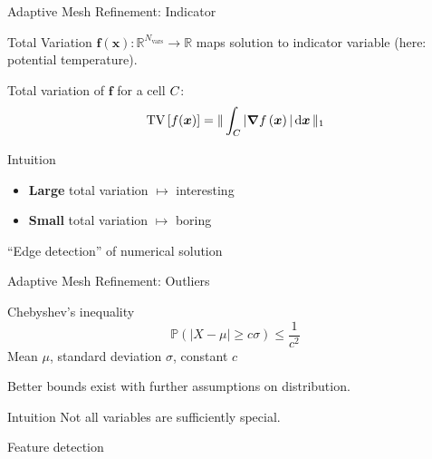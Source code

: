 \documentclass[aspectratio=169]{beamer}
\begin{document}
\begin{frame}{Adaptive Mesh Refinement: Indicator}
  \begin{block}{Total Variation}
  $\bm{f}(\bm{x}): \mathbb{R}^{N_\text{vars}} \to \mathbb{R}$ maps solution to indicator variable (here: potential temperature).

  Total variation of $\bm{f}$ for a cell $C_{}$:
\begin{equation}
  \label{eq:tv}
  \tv \left[ f(\bm{x}) \right] =
  \Vert
\intdcell{ \vert \gradient{f \left( \bm{x} \right)} \vert }
\Vert_1
\end{equation}
    
  \end{block}

\begin{block}{Intuition}
  \begin{itemize}
\item \textbf{Large} total variation $\mapsto$ interesting
\item \textbf{Small} total variation $\mapsto$ boring
  \end{itemize}
  \enquote{Edge detection} of numerical solution
\end{block}

\end{frame}  

\begin{frame}{Adaptive Mesh Refinement: Outliers}
  \begin{block}{Chebyshev's inequality}
\begin{equation}
  \label{eq:chebychev}
  \mathbb{P}(\vert X - \mu \vert \geq c \sigma) \leq \frac{1}{c^2}
\end{equation}
Mean $\mu$, standard deviation $\sigma$, constant $c$

Better bounds exist with further assumptions on distribution.
\end{block}

\begin{block}{Intuition}
Not all variables are sufficiently special.

Feature detection
\end{block}

\end{frame}
  
\end{document}
